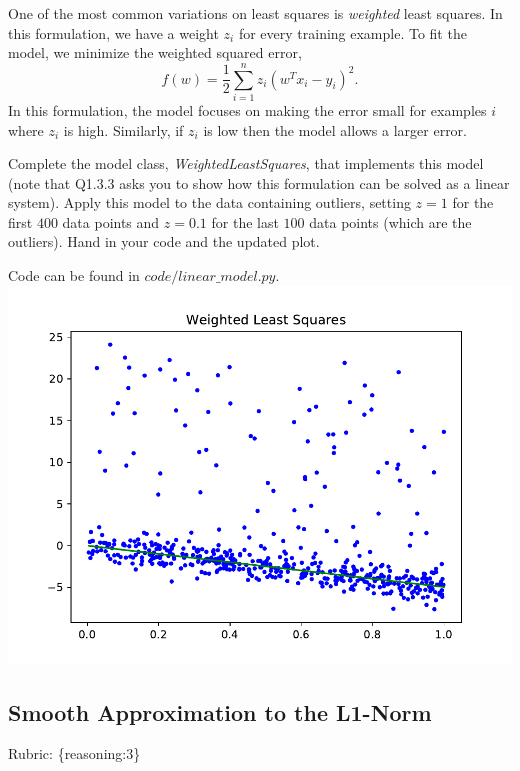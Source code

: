 \documentclass{article}
\def\rubric#1{\gre{Rubric: \{#1\}}}{}
\def\blu#1{{\color{blu}#1}}
\def\gre#1{{\color{gre}#1}}
\begin{document}
One of the most common variations on least squares is \emph{weighted} least squares. In this formulation, we have a weight $z_i$ for every training example. To fit the model, we minimize the weighted squared error,
\[
f(w) =  \frac{1}{2}\sum_{i=1}^n z_i(w^Tx_i - y_i)^2.
\]
In this formulation, the model focuses on making the error small for examples $i$ where $z_i$ is high. Similarly, if $z_i$ is low then the model allows a larger error.

Complete the model class, \emph{WeightedLeastSquares}, that implements this model
(note that Q1.3.3 asks you to show how this formulation can be solved as a linear system).
Apply this model to the data containing outliers, setting $z = 1$ for the first
$400$ data points and $z = 0.1$ for the last $100$ data points (which are the outliers).
\blu{Hand in your code and the updated plot}.

Code can be found in $code/linear\_model.py$.
\\ \includegraphics{../figs/least_squares_outliers_weighted.pdf}


\subsection{Smooth Approximation to the L1-Norm}
\rubric{reasoning:3}
\end{document}
